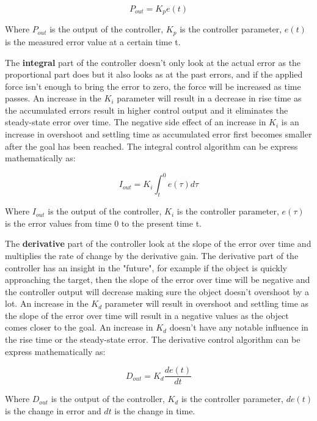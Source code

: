 \documentclass[conference]{IEEEtran}
\begin{document}
\begin{equation}
P_{out} = K_p e(t) \label{eq1}
\end{equation}

Where $P_{out}$ is the output of the controller, $K_p$ is the controller parameter, $e(t)$ is the measured error value at a certain time t. 

The \textbf{integral} part of the controller doesn't only look at the actual error as the proportional part does but it also looks as at the past errors, and if the applied force isn't enough to bring the error to zero, the force will be increased as time passes. An increase in the $K_i$ parameter will result in a decrease in rise time as the accumulated errors result in higher control output and it eliminates the steady-state error over time. The negative side effect of an increase in $K_i$ is an increase in overshoot and settling time as accumulated error first becomes smaller after the goal has been reached. The integral control algorithm can be express mathematically as:

\begin{equation}
I_{out} = K_i \int_{t}^{0}  e(\tau) d\tau \label{eq2}
\end{equation}

Where $I_{out}$ is the output of the controller, $K_i$ is the controller parameter, $e(\tau)$ is the error values from time 0 to the present time t. 

The \textbf{derivative} part of the controller look at the slope of the error over time and multiplies the rate of change by the derivative gain. The derivative part of the controller has an insight in the "future", for example if the object is quickly approaching the target, then the slope of the error over time will be negative and the controller output will decrease making sure the object doesn't overshoot by a lot. An increase in the $K_d$ parameter will result in overshoot and settling time as the slope of the error over time will result in a negative values as the object comes closer to the goal. An increase in $K_d$ doesn't have any notable influence in the rise time or the steady-state error. The derivative control algorithm can be express mathematically as:

\begin{equation}
D_{out} = K_d \frac{de(t)}{dt} \label{eq3}
\end{equation}

Where $D_{out}$ is the output of the controller, $K_d$ is the controller parameter, $de(t)$ is the change in error and $dt$ is the change in time.
\end{document}
